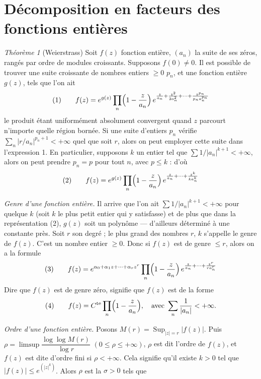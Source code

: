 \documentclass[11pt,a4paper]{article}
\begin{document}
\section{Décomposition en facteurs des fonctions entières}


\emph{Théorème 1} (Weierstrass) Soit $f(z)$ fonction entière, $(a_n)$ la suite de ses zéros, rangés par ordre de modules croissants. Supposons $f(0) \neq 0$. Il est possible de trouver une suite croissante de nombres entiers $\geq 0$ $p_n$, et une fonction entière $g(z)$, tels que l'on ait
\[
  \text{(1)}\qquad f(z) = e^{g(z)} \prod_n \Bigl(1 - \frac{z}{a_n}\Bigr)\, e^{\frac{z}{a_n} + \frac{z^2}{2a_n^2} + \cdots + \frac{z^{p_n}}{p_n a_n^{p_n}}}
\]
le produit étant uniformément absolument convergent quand $z$ parcourt n'importe quelle région bornée. Si  une suite d'entiers $p_n$ vérifie $\sum_n |r/a_n|^{p_n+1} < +\infty$ quel que soit $r$, alors on peut employer cette suite dans l'expression 1. En particulier, supposons $k$ un entier tel que $\sum 1/|a_n|^{k+1} < +\infty$, alors on peut prendre $p_n = p$ pour tout $n$, avec $p \leq k$  : d'où
\[
  \text{(2)}\qquad f(z) = e^{g(z)} \prod_n \Bigl(1 - \frac{z}{a_n}\Bigr)\, e^{\frac{z}{a_n} + \cdots + \frac{z^k}{k a_n^k}}
\]

\emph{Genre d'une fonction entière.} Il arrive que l'on ait $\sum 1/|a_n|^{k+1} < +\infty$ pour quelque $k$ (soit $k$ le plus petit entier qui y satisfasse) et de plus que dans la représentation (2), $g(z)$ soit un polynôme --- d'ailleurs déterminé à une constante près. Soit $r$ son degré ; le plus  grand des nombres $r$, $k$ s'appelle le genre de $f(z)$. C'est un nombre entier $\geq 0$. Donc si $f(z)$ est de genre $\leq r$, alors on a la formule
\[
  \text{(3)}\qquad f(z) = e^{\alpha_0 + \alpha_1 z + \cdots + \alpha_r z^r} \prod_n \Bigl(1 - \frac{z}{a_n}\Bigr)\, e^{\frac{z}{a_n} + \cdots + \frac{z^r}{r a_n^r}}
\]
Dire que $f(z)$ est de genre zéro, signifie que $f(z)$ est de la forme
\[
  \text{(4)}\qquad f(z) = C^{\mathrm{te}} \prod_n \Bigl(1 - \frac{z}{a_n}\Bigr), \quad \text{avec } \sum_n \frac{1}{|a_n|} < +\infty .
\]

\emph{Ordre d'une fonction entière.} Posons $M(r) = \operatorname{Sup}_{|z| = r} |f(z)|$. Puis $\rho = \limsup \dfrac{\log\log M(r)}{\log r}$ $(0 \leq \rho \leq +\infty)$, $\rho$ est dit l'ordre de $f(z)$, et $f(z)$ est dite d'ordre fini si $\rho < +\infty$. Cela signifie qu'il existe $k > 0$ tel que $|f(z)| \leq e^{(|z|^k)}$. Alors $\rho$ est la   $\sigma > 0$ tels que
\end{document}

